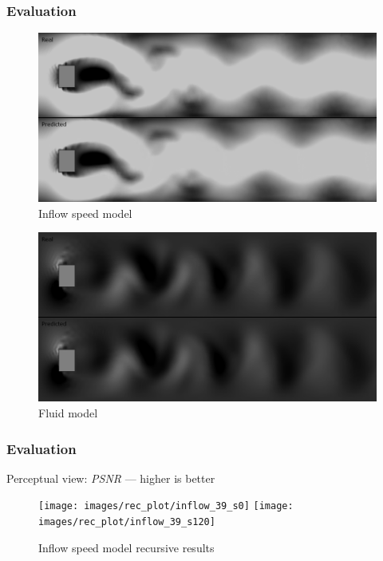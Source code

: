 \documentclass[18pt, xcolor=table]{beamer}
\begin{document}
\begin{frame}[t]
  \frametitle{Evaluation}
  \begin{center}
    \begin{figure}[htb]
      \includegraphics[scale=0.15]{images/flows/x_speed_good}
      \vspace{-0.2cm}
      \caption{Inflow speed model}
    \end{figure}
    \begin{figure}[htb]
      \includegraphics[scale=0.15]{images/flows/y_fluid_good}
      \vspace{-0.2cm}
      \caption{Fluid model}
    \end{figure}
  \end{center}
\end{frame}

\begin{frame}[t]
  \frametitle{Evaluation}
  \large{Perceptual view:} \textit{PSNR} --- higher is better
  \begin{center}
    \begin{figure}[htb]
      \texttt{[image: images/rec\_plot/inflow\_39\_s0]}
      \texttt{[image: images/rec\_plot/inflow\_39\_s120]}
      \caption{Inflow speed model recursive results}
    \end{figure}
  \end{center}
\end{frame}
\end{document}
